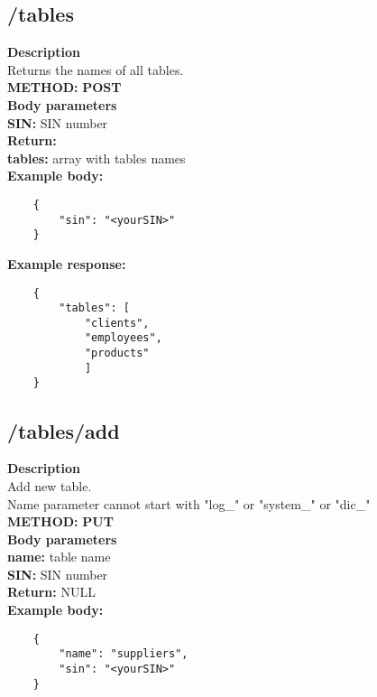 \documentclass[a4paper, 12pt]{report}
\begin{document}
\subsection{/tables}
\textbf{\color{redText} Description} \\
Returns the names of all tables. \\
\textbf{\color{redText} METHOD: } \textbf{POST} \\
\textbf{\color{redText} Body parameters} \\
\textbf{SIN: } SIN number\\
\textbf{\color{redText} Return: } \\
\textbf{tables: } array with tables names \\
\textbf{\color{redText} Example body: }
\begin{lstlisting}
    {
        "sin": "<yourSIN>"
    }
\end{lstlisting}
\textbf{\color{redText} Example response: }
\begin{lstlisting}
    {
        "tables": [
            "clients",
            "employees",
            "products"
            ]
    }
\end{lstlisting}

\subsection{/tables/add}
\textbf{\color{redText} Description} \\
Add new table. \\
Name parameter cannot start with "log\_" or "system\_" or "dic\_"\\
\textbf{\color{redText} METHOD: } \textbf{PUT} \\
\textbf{\color{redText} Body parameters} \\
\textbf{name: } table name\\
\textbf{SIN: } SIN number\\
\textbf{\color{redText} Return: } NULL \\
\textbf{\color{redText} Example body: }
\begin{lstlisting}
    {
        "name": "suppliers",
        "sin": "<yourSIN>"
    }
\end{lstlisting}
\end{document}

